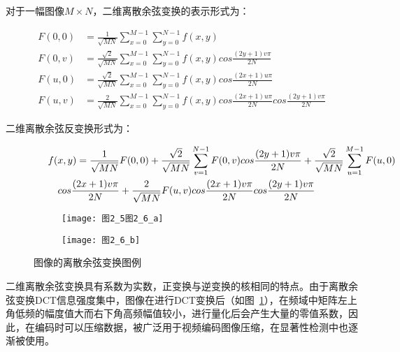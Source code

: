对于一幅图像$M×N$，二维离散余弦变换的表示形式为：
\begin{linenomath}
\begin{align}
F(0,0) &= \frac{1}{\sqrt{MN}}\sum_{x=0}^{M-1}\sum_{y=0}^{N-1}f(x,y)\label{式2_23}\\
F(0,v) &= \frac{\sqrt{2}}{\sqrt{MN}}\sum_{x=0}^{M-1}\sum_{y=0}^{N-1}f(x,y)cos\frac{(2y+1)v\pi}{2N}\label{式2_24}\\
F(u,0) &= \frac{\sqrt{2}}{\sqrt{MN}}\sum_{x=0}^{M-1}\sum_{y=0}^{N-1}f(x,y)cos\frac{(2x+1)u\pi}{2N}\label{式2_25}\\
F(u,v) &= \frac{2}{\sqrt{MN}}\sum_{x=0}^{M-1}\sum_{y=0}^{N-1}f(x,y)cos\frac{(2x+1)u\pi}{2N}cos\frac{(2y+1)v\pi}{2N}\label{式2_26}
\end{align}
\end{linenomath}
二维离散余弦反变换形式为：
\begin{linenomath}
\begin{align}
\lefteqn{ f(x,y)=\frac{1}{\sqrt{MN}}F(0,0)+\frac{\sqrt{2}}{\sqrt{MN}}\sum_{v=1}^{N-1}F(0,v)cos\frac{(2y+1)v\pi}{2N}+\frac{\sqrt{2}}{\sqrt{MN}}\sum_{u=1}^{M-1}F(u,0){} }\nonumber\\
& & {}cos\frac{(2x+1)v\pi}{2N}+\frac{2}{\sqrt{MN}}F(u,v)cos\frac{(2x+1)v\pi}{2N}cos\frac{(2y+1)v\pi}{2N}
\label{式2_27}
\end{align}
\end{linenomath}

\begin{figure}[t]
  \centering%
  \begin{subfigure}{3cm}
    \texttt{[image: 图2\_5图2\_6\_a]}
  \end{subfigure}
  \hspace{4em}%
  \begin{subfigure}{0.25\textwidth}
    \texttt{[image: 图2\_6\_b]}
  \end{subfigure}
  \caption{图像的离散余弦变换图例}
  \label{图2_6}
\end{figure}

二维离散余弦变换具有系数为实数，正变换与逆变换的核相同的特点。由于离散余弦变换DCT信息强度集中，图像在进行DCT变换后（如图~\ref{图2_6}），在频域中矩阵左上角低频的幅度值大而右下角高频幅值较小，进行量化后会产生大量的零值系数，因此，在编码时可以压缩数据\cite{Rao2014book}，被广泛用于视频编码图像压缩，在显著性检测中也逐渐被使用。

